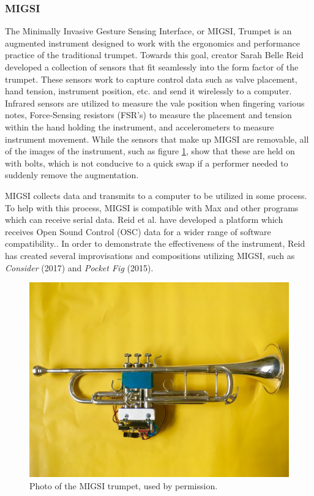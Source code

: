 \subsubsection{MIGSI}

The Minimally Invasive Gesture Sensing Interface, or MIGSI, Trumpet is an augmented instrument designed to work with the ergonomics and performance practice of the traditional trumpet\cite{reid2016}. Towards this goal, creator Sarah Belle Reid developed a collection of sensors that fit seamlessly into the form factor of the trumpet. These sensors work to capture control data such as valve placement, hand tension, instrument position, etc. and send it wirelessly to a computer. Infrared sensors are utilized to measure the vale position when fingering various notes, Force-Sensing resistors (FSR's) to measure the placement and tension within the hand holding the instrument, and accelerometers to measure instrument movement. While the sensors that make up MIGSI are removable, all of the images of the instrument, such as figure \ref{fig:MIGSI}, show that these are held on with bolts, which is not conducive to a quick swap if a performer needed to suddenly remove the augmentation.

MIGSI collects data and transmits to a computer to be utilized in some process. To help with this process, MIGSI is compatible with Max and other programs which can receive serial data\cite{reid2016}. Reid et al. have developed a platform which receives Open Sound Control (OSC) data for a wider range of software compatibility.\cite{reid_2019}. In order to demonstrate the effectiveness of the instrument, Reid has created several improvisations and compositions utilizing MIGSI, such as \textit{Consider} (2017) and \textit{Pocket Fig} (2015).

\begin{figure}
    \centering
    \includegraphics[scale=0.25]{diagrams/MIGSI.jpg}
    \caption{Photo of the MIGSI trumpet, used by permission.}
    \label{fig:MIGSI} %
\end{figure}


